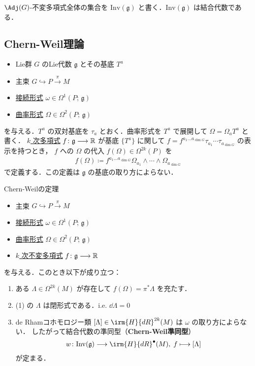 \documentclass[TQFT_main]{subfiles}
\begin{document}
$\Adj (G)$-不変多項式全体の集合を $\bm{\mathrm{Inv}(\mathfrak{g})}$ と書く．$\mathrm{Inv}(\mathfrak{g})$ は結合代数である．

\subsection{Chern-Weil理論}

\begin{itemize}
    \item Lie群 $G$ のLie代数 $\mathfrak{g}$ とその基底 $T^a$
    \item 主束 $G \hookrightarrow P \xrightarrow{\pi} M$
    \item \hyperref[def:connection]{接続形式} $\omega \in \Omega^1(P;\, \mathfrak{g})$
    \item \hyperref[def:curvature]{曲率形式} $\Omega \in \Omega^2(P;\, \mathfrak{g})$
\end{itemize}
を与える．$T^a$ の双対基底を $\tau_a$ とおく．曲率形式を $T^a$ で展開して $\Omega = \Omega_a T^a$ と書く．
\hyperref[def:polynomial]{$k$ 次多項式} $f \colon \mathfrak{g} \longrightarrow \mathbb{R}$ が基底 $\{T^a\}$ に関して $f = f^{a_1 \dots a_{\dim G}} \tau_{a_1} \cdots \tau_{a_{\dim G}}$ の表示を持つとき，
$f$ への $\Omega$ の代入 $f(\Omega) \in \Omega^{2k}(P)$ を
\begin{align}
    f(\Omega) \coloneqq f^{a_1 \dots a_{\dim G}} \Omega_{a_1} \wedge \cdots \wedge \Omega_{a_{\dim G}}
\end{align}
で定義する．この定義は $\mathfrak{g}$ の基底の取り方によらない．

\begin{mytheo}[label=thm:Chern-Weil]{Chern-Weilの定理}
    \begin{itemize}
        \item 主束 $G \hookrightarrow P \xrightarrow{\pi} M$
        \item \hyperref[def:connection]{接続形式} $\omega \in \Omega^1(P;\, \mathfrak{g})$
        \item \hyperref[def:curvature]{曲率形式} $\Omega \in \Omega^2(P;\, \mathfrak{g})$
        \item \hyperref[def:invariant]{$k$ 次不変多項式} $f \colon \mathfrak{g} \longrightarrow \mathbb{R}$
    \end{itemize}
    を与える．このとき以下が成り立つ：
    \begin{enumerate}
        \item ある $\Lambda \in \Omega^{2k}(M)$ が存在して $f(\Omega) = \pi^* \Lambda$ を充たす．
        \item (1) の $\Lambda$ は閉形式である．i.e. $\dd{\Lambda} = 0$
        \item de Rhamコホモロジー類 $[\Lambda] \in \irm{H}{dR}^{2k} (M)$ は $\omega$ の取り方によらない．
        したがって結合代数の準同型（\textbf{Chern-Weil準同型}）
        \begin{align}
            w \colon \mathrm{Inv}(\mathfrak{g}) \lto \irm{H}{dR}^\bullet (M),\; f \lmto [\Lambda]
        \end{align}
        が定まる．
    \end{enumerate}
\end{mytheo}
\end{document}
